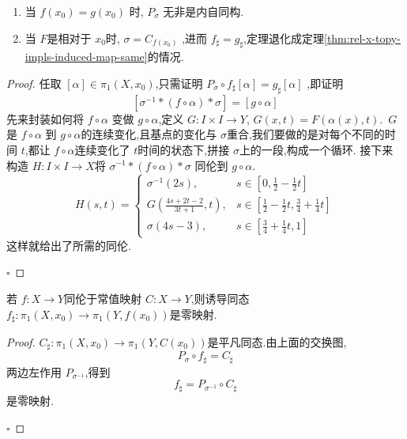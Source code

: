\documentclass[../../几何与拓扑.tex]{subfiles}
\begin{document}
\begin{remark}
    \begin{enumerate}
        \item 当 \(  f\left( x_0 \right)=  g\left( x_0 \right)    \) 时, \(  P_{\sigma }  \) 无非是内自同构.
        \item 当 \(  F  \)是相对于 \(  x_0  \)时, \(  \sigma =  C_{f\left( x_0 \right) } \)  ,进而 \(  f_{\sharp } =  g_{\sharp }  \),定理退化成定理\ref{thm:rel-x-topy-impls-induced-map-same}的情况.  
    \end{enumerate}
    
\end{remark}

\begin{proof}

    任取 \(  [\alpha ]\in \pi _1 \left( X,x_0 \right)   \),只需证明 \(  P_{ \sigma }\circ f_{\sharp }[\alpha ]=  g_{\sharp }[\alpha ]  \)  ,即证明 \[
    [\sigma ^{-1} *\left( f\circ \alpha  \right)*\sigma  ] =  [g\circ \alpha ]
    \]先来封装如何将 \(  f\circ \alpha   \) 变做 \(  g\circ \alpha   \),定义 \(   G: I\times I\to Y  \),  \(  G\left( x,t \right) =  F\left( \alpha \left( x \right),t  \right)    \).\
    \(  G  \)是 \(  f\circ \alpha   \)  到 \(  g\circ \alpha   \)的连续变化,且基点的变化与 \(  \sigma   \)重合,我们要做的是对每个不同的时间 \(  t  \),都让 \(  f\circ \alpha   \)连续变化了 \(  t  \)时间的状态下,拼接 \(  \sigma   \)上的一段,构成一个循环.     接下来
    构造 \(  H: I\times I \to X  \)将 \(  \sigma ^{-1} * \left( f\circ \alpha  \right)* \sigma    \)     同伦到 \(  g\circ \alpha   \). \[
    H\left( s,t \right) =  \begin{cases} \sigma ^{-1} \left(2s  \right),&  s \in [ 0, \frac{1}{2} -\frac{1}{2}t ] \\ 
     G\left(   \frac{4s+ 2t-2 }{ 3t+ 1 }  ,t \right) ,&  s \in [\frac{1}{2}-\frac{1}{2}t, \frac{3}{4}+  \frac{1}{4}t]\\ 
      \sigma \left(  4s-3  \right),&s \in  [ \frac{3}{4}+  \frac{1}{4}t ,1]  \end{cases}  
    \]这样就给出了所需的同伦.

    \hfill $\square$
\end{proof}

\begin{corollary}
    若 \(  f: X \to Y  \)同伦于常值映射 \(  C:X \to Y  \),则诱导同态 \(  f_{\sharp }: \pi _1 \left( X,x_0 \right)\to \pi _1 \left( Y,f\left( x_0 \right)  \right)    \)是零映射.   
\end{corollary}
\begin{proof}

    \(  C_{\sharp }: \pi _1 \left( X,x_0 \right)\to \pi _1 \left( Y,C\left( x_0 \right)  \right)    \)是平凡同态.由上面的交换图, \[
    P_{\sigma } \circ f_{\sharp } =  C_{\sharp }
    \] 两边左作用 \(  P_{\sigma ^{-1} }  \),得到 \[
    f_{\sharp } =  P_{\sigma ^{-1} }\circ C_{\sharp }
    \] 是零映射.

    \hfill $\square$
\end{proof}
\end{document}
